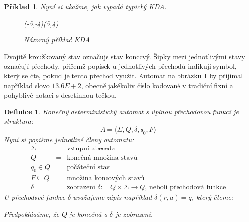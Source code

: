\documentclass[10pt, a4paper, titlepage]{article}
\theoremstyle{note}
\newtheorem{definice}{Definice}
\newtheorem{priklad}{Příklad}
\begin{document}
\begin{priklad}
Nyní si ukažme, jak vypadá typický KDA.

\begin{figure}[ht]
\begin{center}
\begin{VCPicture}{(-5,-4)(5,4)}







\end{VCPicture}
\end{center}
\caption{Názorný příklad KDA}\label{obr-kda}
\end{figure}
\end{priklad}

Dvojitě kroužkovaný stav označuje stav koncový. Šipky mezi jednotlivými stavy označují přechody, přičemž popisek u jednotlivých přechodů
indikuji symbol, který se čte, pokud je tento přechod využit. Automat na obrázku \ref{obr-kda} by přijímal například slovo $13.6E+2$, obecně
jakékoliv číslo kodované v tradiční fixní a pohyblivé notaci s desetinnou tečkou.

\begin{definice}
Konečný deterministický automat s úplnou přechodovou funkcí je struktura:
$$
A = \langle \Sigma, Q, \delta, q_0, F \rangle
$$
Nyní si popišme jednotlivé členy automatu:
\begin{eqnarray*}
\Sigma &=& \text{vstupní abeceda} \\
Q &=& \text{konečná množina stavů} \\
q_0 \in Q &=& \text{počáteční stav} \\
F \subseteq Q &=& \text{množina koncových stavů} \\
\delta &=& \text{zobrazení } \delta:\quad Q \times \Sigma \rightarrow Q \text{, neboli přechodová funkce}
\end{eqnarray*}
U přechodové funkce $\delta$ uvažujeme zápis například $\delta(r, a) = q$, který čteme: 

Předpokládáme, že $Q$ je konečná a $\delta$ je zobrazení.
\end{definice}
\end{document}

